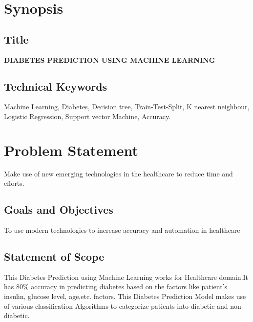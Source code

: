 \documentclass[pdftex,a4paper,11pt,oneside,openright]{report}
\begin{document}
\chapter{\bf Synopsis }
\section{\bf Title}
\large{\bf DIABETES PREDICTION USING MACHINE LEARNING}

\section{Technical Keywords}
\Large{Machine Learning, Diabetes, Decision tree, Train-Test-Split, K nearest neighbour, Logistic Regression, Support vector Machine, Accuracy.
} 

\chapter{Problem Statement}
\Large{Make use of new emerging technologies in the healthcare to reduce time and efforts.}
\section{Goals and Objectives}
\Large{To use modern technologies to increase accuracy and automation in healthcare}
\section{Statement of Scope}
\Large{This Diabetes Prediction using Machine Learning works for Healthcare domain.It has 80\% accuracy in predicting diabetes based on the factors like patient's insulin, glucose level, age,etc. factors. This Diabetes Prediction Model makes use of various classification Algorithms to categorize patients into diabetic and non-diabetic.}
\end{document}
